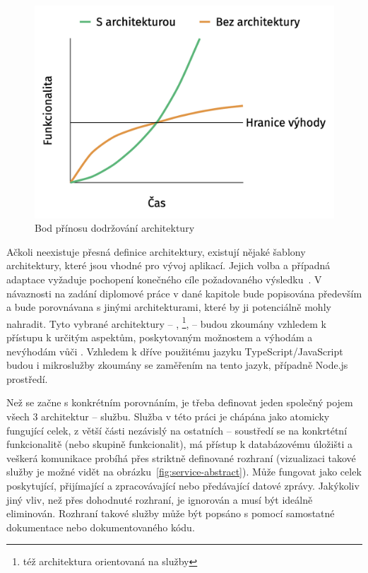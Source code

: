 \begin{figure}[htbp]
   \centering
   \includegraphics[max width=\textwidth]{assets/draft-architecture-line}
   \caption{Bod přínosu dodržování architektury~\cite{archoworthit}}\label{fig:architecture-line}
\end{figure}


Ačkoli neexistuje přesná definice architektury, existují nějaké šablony architektury, které jsou vhodné pro vývoj aplikací.
Jejich volba a případná adaptace vyžaduje pochopení konečného cíle požadovaného výsledku~\cite{softarch}.
V návaznosti na zadání diplomové práce v dané kapitole bude popisována především  a bude porovnávana s jinými architekturami, které by ji potenciálně mohly nahradit.
Tyto vybrané architektury – , \footnote{též architektura orientovaná na služby},  – budou zkoumány vzhledem k přístupu k určitým aspektům, poskytovaným možnostem a výhodám a nevýhodám vůči .
Vzhledem k dříve použitému jazyku TypeScript/JavaScript budou i mikroslužby zkoumány se zaměřením na tento jazyk, případně Node.js prostředí.


Než se začne s konkrétním porovnáním, je třeba definovat jeden společný pojem všech 3 architektur – službu.
Služba v této práci je chápána jako atomicky fungující celek, z větší části nezávislý na ostatních – soustředí se na konkrtétní funkcionalitě (nebo skupině funkcionalit), má přístup k databázovému úložišti a veškerá komunikace probíhá přes striktně definované rozhraní (vizualizaci takové služby je možné vidět na obrázku~\ref{fig:service-abstract}).
Může fungovat jako celek poskytující, přijímající a zpracovávající nebo předávající datové zprávy.
Jakýkoliv jiný vliv, než přes dohodnuté rozhraní, je ignorován a musí být ideálně eliminován.
Rozhraní takové služby může být popsáno s pomocí samostatné dokumentace nebo dokumentovaného kódu.


